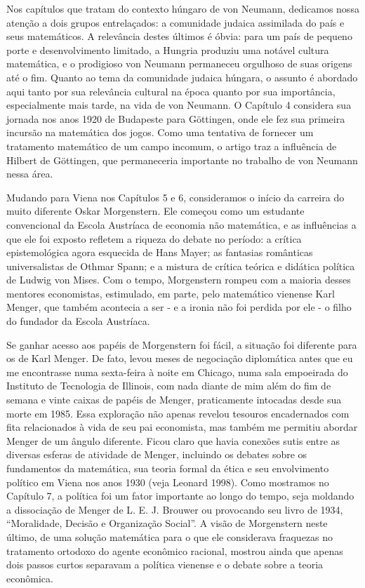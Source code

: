 \documentclass[a4paper,12pt]{article}[abntex2]
\begin{document}
Nos capítulos que tratam do contexto húngaro de von Neumann, dedicamos nossa atenção a dois grupos entrelaçados: a comunidade judaica assimilada do país e seus matemáticos. A relevância destes últimos é óbvia: para um país de pequeno porte e desenvolvimento limitado, a Hungria produziu uma notável cultura matemática, e o prodigioso von Neumann permaneceu orgulhoso de suas origens até o fim. Quanto ao tema da comunidade judaica húngara, o assunto é abordado aqui tanto por sua relevância cultural na época quanto por sua importância, especialmente mais tarde, na vida de von Neumann. O Capítulo 4 considera sua jornada nos anos 1920 de Budapeste para Göttingen, onde ele fez sua primeira incursão na matemática dos jogos. Como uma tentativa de fornecer um tratamento matemático de um campo incomum, o artigo traz a influência de Hilbert de Göttingen, que permaneceria importante no trabalho de von Neumann nessa área.

Mudando para Viena nos Capítulos 5 e 6, consideramos o início da carreira do muito diferente Oskar Morgenstern. Ele começou como um estudante convencional da Escola Austríaca de economia não matemática, e as influências a que ele foi exposto refletem a riqueza do debate no período: a crítica epistemológica agora esquecida de Hans Mayer; as fantasias românticas universalistas de Othmar Spann; e a mistura de crítica teórica e didática política de Ludwig von Mises. Com o tempo, Morgenstern rompeu com a maioria desses mentores economistas, estimulado, em parte, pelo matemático vienense Karl Menger, que também acontecia a ser - e a ironia não foi perdida por ele - o filho do fundador da Escola Austríaca.

Se ganhar acesso aos papéis de Morgenstern foi fácil, a situação foi diferente para os de Karl Menger. De fato, levou meses de negociação diplomática antes que eu me encontrasse numa sexta-feira à noite em Chicago, numa sala empoeirada do Instituto de Tecnologia de Illinois, com nada diante de mim além do fim de semana e vinte caixas de papéis de Menger, praticamente intocadas desde sua morte em 1985. Essa exploração não apenas revelou tesouros encadernados com fita relacionados à vida de seu pai economista, mas também me permitiu abordar Menger de um ângulo diferente. Ficou claro que havia conexões sutis entre as diversas esferas de atividade de Menger, incluindo os debates sobre os fundamentos da matemática, sua teoria formal da ética e seu envolvimento político em Viena nos anos 1930 (veja Leonard 1998). Como mostramos no Capítulo 7, a política foi um fator importante ao longo do tempo, seja moldando a dissociação de Menger de L. E. J. Brouwer ou provocando seu livro de 1934, “Moralidade, Decisão e Organização Social”. A visão de Morgenstern neste último, de uma solução matemática para o que ele considerava fraquezas no tratamento ortodoxo do agente econômico racional, mostrou ainda que apenas dois passos curtos separavam a política vienense e o debate sobre a teoria econômica.
\end{document}
